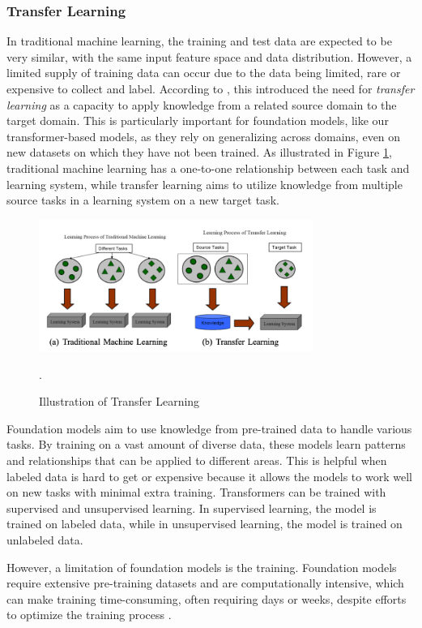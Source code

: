 \documentclass[12pt,a4paper]{article}
\begin{document}
\subsubsection{Transfer Learning}
In traditional machine learning, the training and test data are expected to be very similar, with the same input feature space and data distribution. However, a limited supply of training data can occur due to the data being limited, rare or expensive to collect and label. According to \cite[1--2]{Weiss2016}, this introduced the need for \textit{transfer learning} as a capacity to apply knowledge from a related source domain to the target domain. This is particularly important for foundation models, like our transformer-based models, as they rely on generalizing across domains, even on new datasets on which they have not been trained. As illustrated in Figure \ref{transferlearning}, traditional machine learning has a one-to-one relationship between each task and learning system, while transfer learning aims to utilize knowledge from multiple source tasks in a learning system on a new target task.

\begin{figure}[htbp]
  \centering
  \includegraphics[width=0.8\textwidth]{transferlearning.png}
  \caption{Illustration of Transfer Learning \parencite{Pan2010}}.
  \label{transferlearning}
\end{figure}

Foundation models aim to use knowledge from pre-trained data to handle various tasks. By training on a vast amount of diverse data, these models learn patterns and relationships that can be applied to different areas. This is helpful when labeled data is hard to get or expensive because it allows the models to work well on new tasks with minimal extra training. Transformers can be trained with supervised and unsupervised learning. In supervised learning, the model is trained on labeled data, while in unsupervised learning, the model is trained on unlabeled data.

However, a limitation of foundation models is the training. Foundation models require extensive pre-training datasets and are computationally intensive, which can make training time-consuming, often requiring days or weeks, despite efforts to optimize the training process \parencite{Ivanov2020,Yang2022}.
\end{document}

